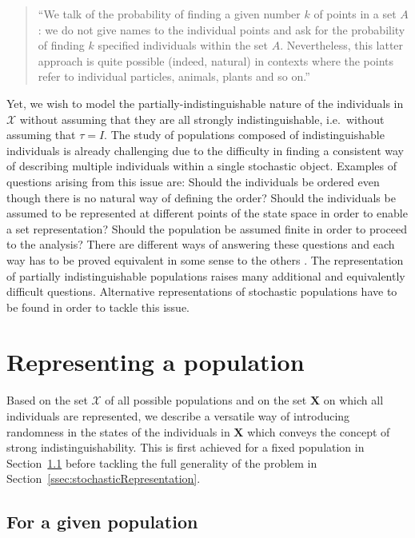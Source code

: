 \documentclass{aptpub}
\numberwithin{equation}{section}
\begin{document}
\begin{quotation}
``We talk of the probability of finding a given number $k$ of points in a set $A$: we do not give names to the individual points and ask for the probability of finding $k$ specified individuals within the set $A$. Nevertheless, this latter approach is quite possible (indeed, natural) in contexts where the points refer to individual particles, animals, plants and so on.'' \citep[p.~124]{Daley2003}
\end{quotation}

Yet, we wish to model the partially-indistinguishable nature of the individuals in ${\mathcal{X}}$ without assuming that they are all strongly indistinguishable, i.e.\ without assuming that $\tau = I$. The study of populations composed of indistinguishable individuals is already challenging due to the difficulty in finding a consistent way of describing multiple individuals within a single stochastic object. Examples of questions arising from this issue are: Should the individuals be ordered even though there is no natural way of defining the order? Should the individuals be assumed to be represented at different points of the state space in order to enable a set representation? Should the population be assumed finite in order to proceed to the analysis? There are different ways of answering these questions and each way has to be proved equivalent in some sense to the others \citep{Moyal1962,Macchi1975}. The representation of partially indistinguishable populations raises many additional and equivalently difficult questions. Alternative representations of stochastic populations have to be found in order to tackle this issue.

\section{Representing a population}
\label{ssec:popRep}

Based on the set ${\boldsymbol{\mathcal{X}}}$ of all possible populations and on the set ${\mathbf{X}}$ on which all individuals are represented, we describe a versatile way of introducing randomness in the states of the individuals in ${\mathbf{X}}$ which conveys the concept of strong indistinguishability. This is first achieved for a fixed population in Section~\ref{ssec:givenPop} before tackling the full generality of the problem in Section~\ref{ssec:stochasticRepresentation}.

\subsection{For a given population}
\label{ssec:givenPop}
\end{document}

